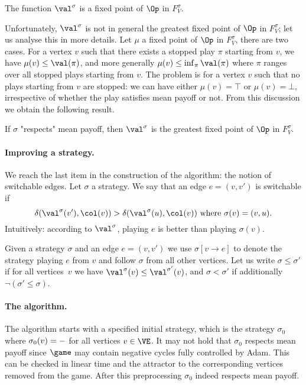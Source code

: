 \begin{fact}
The function $\val^\sigma$ is a fixed point of $\Op$ in $F^\sigma_V$.
\end{fact}
Unfortunately, $\val^{\sigma}$ is not in general the greatest fixed point of $\Op$ in $F^\sigma_V$;
let us analyse this in more details.
Let $\mu$ a fixed point of $\Op$ in $F^\sigma_V$, there are two cases. 
For a vertex $v$ such that there exists a stopped play $\pi$ starting from $v$, we have $\mu(v) \le \val(\pi)$, and more generally
$\mu(v) \le \inf_{\pi} \val(\pi)$ where $\pi$ ranges over all stopped plays starting from $v$.
The problem is for a vertex $v$ such that no plays starting from $v$ are stopped: 
we can have either $\mu(v) = \top$ or $\mu(v) = \bot$, irrespective of whether the play satisfies mean payoff or not.
From this discussion we obtain the following result.

\begin{lemma}
\label{3-lem:greatest_fixed_point}
If $\sigma$ "respects" mean payoff, then $\val^{\sigma}$ is the greatest fixed point of $\Op$ in $F^\sigma_V$.
\end{lemma}

\paragraph{\bf Improving a strategy.}
We reach the last item in the construction of the algorithm: the notion of switchable edges.
Let $\sigma$ a strategy. We say that an edge $e = (v,v')$ is switchable if 
\[
\delta(\val^{\sigma}(v'),\col(v)) > \delta(\val^{\sigma}(u),\col(v)) \text{ where } \sigma(v) = (v,u).
\]
Intuitively: according to $\val^{\sigma}$, playing $e$ is better than playing $\sigma(v)$.

Given a strategy $\sigma$ and an edge $e = (v,v')$ we use $\sigma[v \to e]$ to denote the strategy playing $e$ from $v$ 
and follow $\sigma$ from all other vertices.
Let us write $\sigma \le \sigma'$ if for all vertices~$v$ we have $\val^{\sigma}(v) \le \val^{\sigma'}(v)$,
and $\sigma < \sigma'$ if additionally $\neg (\sigma' \le \sigma)$.

\paragraph{\bf The algorithm.}
The algorithm starts with a specified initial strategy, which is the strategy
$\sigma_0$ where $\sigma_0(v) = \mathtt{-}$ for all vertices $v \in \VE$. 
It may not hold that $\sigma_0$ respects mean payoff since $\game$ may contain negative cycles fully controlled by Adam.
This can be checked in linear time and the attractor to the corresponding vertices removed from the game.
After this preprocessing $\sigma_0$ indeed respects mean payoff.

